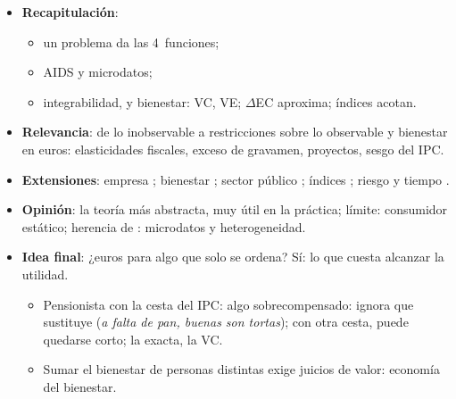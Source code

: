 \documentclass{article}
\begin{document}
\begin{columnas}
\begin{itemize}
\item \textbf{Recapitulación}:
  \begin{itemize}
  \item un problema da las 4~funciones;
  \item AIDS y microdatos;
  \item integrabilidad,  y bienestar: VC, VE; $\Delta$EC aproxima; índices acotan.
  \end{itemize}
\item \textbf{Relevancia}: de lo inobservable a restricciones sobre lo observable y bienestar en euros: elasticidades fiscales, exceso de gravamen, proyectos, sesgo del IPC.
\item \textbf{Extensiones}: empresa ; bienestar   ; sector público  ; índices  ; riesgo y tiempo  .
\item \textbf{Opinión}: la teoría más abstracta, muy útil en la práctica; límite: consumidor estático; herencia de : microdatos y heterogeneidad.
\item \textbf{Idea final}: ¿euros para algo que solo se ordena? Sí: lo que cuesta alcanzar la utilidad.
  \begin{itemize}
  \item Pensionista con la cesta del IPC: algo sobrecompensado:  ignora que sustituye (\emph{a falta de pan, buenas son tortas}); con otra cesta, puede quedarse corto; la exacta, la VC.
  \item Sumar el bienestar de personas distintas exige juicios de valor: economía del bienestar.
  \end{itemize}
\end{itemize}


\end{columnas}
\end{document}
